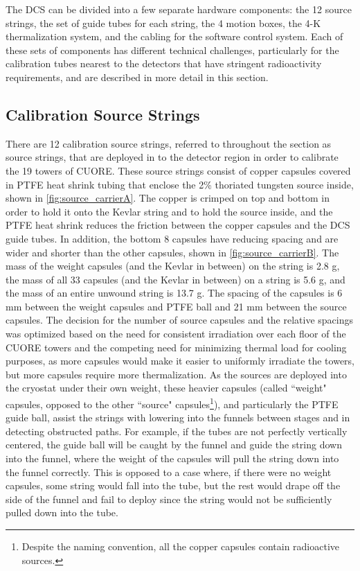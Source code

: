 The DCS can be divided into a few separate hardware components: the 12 source strings, the set of guide tubes for each string, the 4 motion boxes, the 4-K thermalization system, and the cabling for the software control system.
Each of these sets of components has different technical challenges, particularly for the calibration tubes nearest to the detectors that have stringent radioactivity requirements, and are described in more detail in this section.

\subsection*{Calibration Source Strings}
There are 12 calibration source strings, referred to throughout the section as source strings, that are deployed in to the detector region in order to calibrate the 19 towers of CUORE.
These source strings consist of copper capsules covered in PTFE heat shrink tubing that enclose the 2\% thoriated tungsten source inside, shown in \autoref{fig:source_carrierA}.
The copper is crimped on top and bottom in order to hold it onto the Kevlar string and to hold the source inside, and the PTFE heat shrink reduces the friction between the copper capsules and the DCS guide tubes. In addition, the bottom 8 capsules have reducing spacing and are wider and shorter than the other capsules, shown in \autoref{fig:source_carrierB}.
The mass of the weight capsules (and the Kevlar in between) on the string is 2.8 g, the mass of all 33 capsules (and the Kevlar in between) on a string is 5.6 g, and the mass of an entire unwound string is 13.7 g.
The spacing of the capsules is 6 mm between the weight capsules and PTFE ball and 21 mm between the source capsules.
The decision for the number of source capsules and the relative spacings was optimized based on the need for consistent irradiation over each floor of the CUORE towers and the competing need for minimizing thermal load for cooling purposes, as more capsules would make it easier to uniformly irradiate the towers, but more capsules require more thermalization.
As the sources are deployed into the cryostat under their own weight, these heavier capsules (called ``weight" capsules, opposed to the other ``source" capsules\footnote{Despite the naming convention, all the copper capsules contain radioactive sources.}), and particularly the PTFE guide ball, assist the strings with lowering into the funnels between stages and in detecting obstructed paths.
For example, if the tubes are not perfectly vertically centered, the guide ball will be caught by the funnel and guide the string down into the funnel, where the weight of the capsules will pull the string down into the funnel correctly.
This is opposed to a case where, if there were no weight capsules, some string would fall into the tube, but the rest would drape off the side of the funnel and fail to deploy since the string would not be sufficiently pulled down into the tube.

